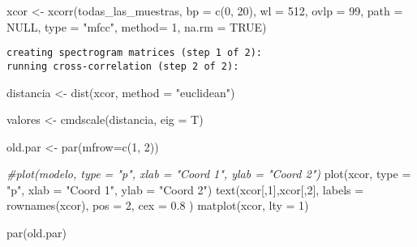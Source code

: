 \documentclass[
]{article}
\newenvironment{Shaded}{\begin{snugshade}}{\end{snugshade}}
\newcommand{\AttributeTok}[1]{\textcolor[rgb]{0.77,0.63,0.00}{#1}}
\newcommand{\CommentTok}[1]{\textcolor[rgb]{0.56,0.35,0.01}{\textit{#1}}}
\newcommand{\ConstantTok}[1]{\textcolor[rgb]{0.00,0.00,0.00}{#1}}
\newcommand{\DecValTok}[1]{\textcolor[rgb]{0.00,0.00,0.81}{#1}}
\newcommand{\FloatTok}[1]{\textcolor[rgb]{0.00,0.00,0.81}{#1}}
\newcommand{\FunctionTok}[1]{\textcolor[rgb]{0.00,0.00,0.00}{#1}}
\newcommand{\NormalTok}[1]{#1}
\newcommand{\OtherTok}[1]{\textcolor[rgb]{0.56,0.35,0.01}{#1}}
\newcommand{\StringTok}[1]{\textcolor[rgb]{0.31,0.60,0.02}{#1}}
\begin{document}
\begin{Shaded}
\begin{Highlighting}[]
\NormalTok{xcor }\OtherTok{\textless{}{-}} \FunctionTok{xcorr}\NormalTok{(todas\_las\_muestras, }\AttributeTok{bp =} \FunctionTok{c}\NormalTok{(}\DecValTok{0}\NormalTok{, }\DecValTok{20}\NormalTok{), }\AttributeTok{wl =} \DecValTok{512}\NormalTok{, }\AttributeTok{ovlp =} \DecValTok{99}\NormalTok{, }\AttributeTok{path =} \ConstantTok{NULL}\NormalTok{,}
              \AttributeTok{type =} \StringTok{"mfcc"}\NormalTok{, }\AttributeTok{method=} \DecValTok{1}\NormalTok{, }\AttributeTok{na.rm =} \ConstantTok{TRUE}\NormalTok{)}
\end{Highlighting}
\end{Shaded}

\begin{verbatim}
creating spectrogram matrices (step 1 of 2):
running cross-correlation (step 2 of 2):
\end{verbatim}

\begin{Shaded}
\begin{Highlighting}[]
\NormalTok{distancia }\OtherTok{\textless{}{-}} \FunctionTok{dist}\NormalTok{(xcor, }\AttributeTok{method =} \StringTok{"euclidean"}\NormalTok{)}
\end{Highlighting}
\end{Shaded}

\begin{Shaded}
\begin{Highlighting}[]
\NormalTok{valores }\OtherTok{\textless{}{-}} \FunctionTok{cmdscale}\NormalTok{(distancia, }\AttributeTok{eig =}\NormalTok{ T)}
\end{Highlighting}
\end{Shaded}

\begin{Shaded}
\begin{Highlighting}[]
\NormalTok{old.par }\OtherTok{\textless{}{-}} \FunctionTok{par}\NormalTok{(}\AttributeTok{mfrow=}\FunctionTok{c}\NormalTok{(}\DecValTok{1}\NormalTok{, }\DecValTok{2}\NormalTok{))}

\CommentTok{\#plot(modelo, type = "p", xlab = "Coord 1", ylab = "Coord 2")}
\FunctionTok{plot}\NormalTok{(xcor, }\AttributeTok{type =} \StringTok{"p"}\NormalTok{, }\AttributeTok{xlab =} \StringTok{"Coord 1"}\NormalTok{, }\AttributeTok{ylab =} \StringTok{"Coord 2"}\NormalTok{)}
\FunctionTok{text}\NormalTok{(xcor[,}\DecValTok{1}\NormalTok{],xcor[,}\DecValTok{2}\NormalTok{], }\AttributeTok{labels =} \FunctionTok{rownames}\NormalTok{(xcor), }\AttributeTok{pos =} \DecValTok{2}\NormalTok{, }\AttributeTok{cex =} \FloatTok{0.8}\NormalTok{ )}
\FunctionTok{matplot}\NormalTok{(xcor, }\AttributeTok{lty =} \DecValTok{1}\NormalTok{)}

\FunctionTok{par}\NormalTok{(old.par)}
\end{Highlighting}
\end{Shaded}
\end{document}
